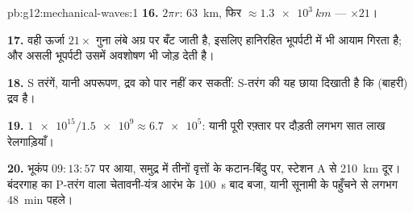 \begin{solution}{pb:g12:mechanical-waves:1}
\textbf{16.} $2\pi r$: \qty{63}{km}, फिर $\approx \qty{1.3e3}{km}$ --- $\times 21$।

\textbf{17.} वही ऊर्जा $21\times$ गुना लंबे अग्र पर बँट जाती है, इसलिए
हानिरहित भूपर्पटी में भी आयाम गिरता है; और असली भूपर्पटी उसमें
अवशोषण भी जोड़ देती है।

\textbf{18.} S तरंगें, यानी  अपरूपण, द्रव को पार
नहीं कर सकतीं: S-तरंग की यह छाया दिखाती है कि (बाहरी)  द्रव है।

\textbf{19.} $\num{1e15}/\num{1.5e9} \approx \num{6.7e5}$: यानी पूरी रफ़्तार पर दौड़ती लगभग सात लाख रेलगाड़ियाँ।

\textbf{20.} भूकंप $09{:}13{:}57$ पर आया, समुद्र में तीनों वृत्तों के कटान-बिंदु
पर, स्टेशन A से \qty{210}{km} दूर। बंदरगाह का P-तरंग वाला चेतावनी-यंत्र
आरंभ के \qty{100}{s} बाद बजा, यानी सूनामी के पहुँचने से लगभग \qty{48}{min} पहले।
\end{solution}
